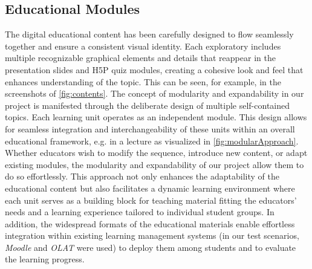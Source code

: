\subsection{Educational Modules} %
The digital educational content has been carefully designed to flow seamlessly together and ensure a consistent visual identity. Each exploratory includes multiple recognizable graphical elements and details that reappear in the presentation slides and H5P quiz modules, creating a cohesive look and feel that enhances understanding of the topic. This can be seen, for example, in the screenshots of \autoref{fig:contents}.
The concept of modularity and expandability in our project is manifested through the deliberate design of multiple self-contained topics. Each learning unit operates as an independent module. This design allows for seamless integration and interchangeability of these units within an overall educational framework, e.g. in a lecture as visualized in \autoref{fig:modularApproach}. Whether educators wish to modify the sequence, introduce new content, or adapt existing modules, the modularity and expandability of our project allow them to do so effortlessly. This approach not only enhances the adaptability of the educational content but also facilitates a dynamic learning environment where each unit serves as a building block for teaching material fitting the educators' needs and a learning experience tailored to individual student groups. In addition, the widespread formats of the educational materials enable effortless integration within existing learning management systems (in our test scenarios, \emph{Moodle} and \emph{OLAT} were used) to deploy them among students and to evaluate the learning progress.

